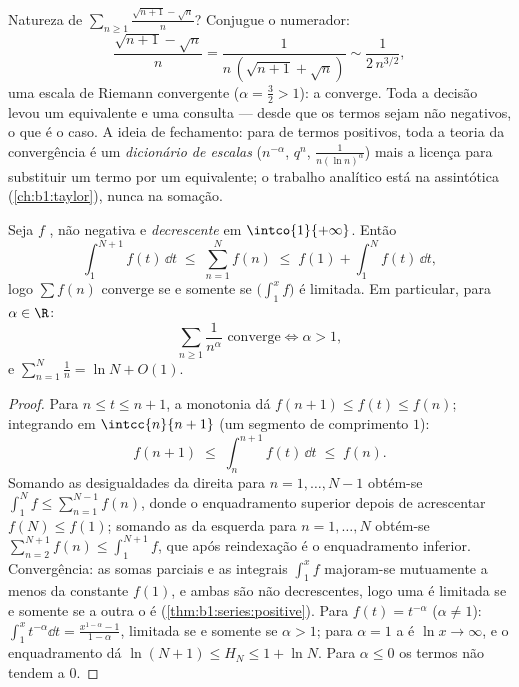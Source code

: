 \begin{example}\label{ex:b1:series:equivtest}
Natureza de $\sum_{n \geq 1} \frac{\sqrt{n+1} - \sqrt n}{n}$?
Conjugue o numerador:
\[
\frac{\sqrt{n+1} - \sqrt n}{n}
= \frac{1}{n\,(\sqrt{n+1} + \sqrt n)}
\sim \frac{1}{2\,n^{3/2}} ,
\]
uma escala de Riemann convergente ($\alpha = \frac32 > 1$): a 
converge. Toda a decisão levou um equivalente e uma consulta
--- desde que os termos sejam não negativos, o que é o caso. A
ideia de fechamento: para  de termos positivos, toda a teoria
da convergência é um \emph{dicionário de escalas} ($n^{-\alpha}$, $q^n$,
$\frac{1}{n(\ln n)^\alpha}$) mais a licença para substituir um termo
por um equivalente; o trabalho analítico está na assintótica
(\cref{ch:b1:taylor}), nunca na somação.
\end{example}

\begin{theorem}\label{thm:b1:series:riemann}
Seja $f$ , não negativa e \emph{decrescente} em
$\intco{1}{+\infty}$. Então
\[
\int_1^{N+1} f(t)\,\dd t \;\leq\; \sum_{n=1}^{N} f(n) \;\leq\; f(1)
+ \int_1^{N} f(t)\,\dd t ,
\]
logo $\sum f(n)$ converge se e somente se $\bigl(\int_1^x f\bigr)$ é limitada. Em
particular, para $\alpha \in \R$:
\[
\sum_{n \geq 1} \frac{1}{n^\alpha} \text{ converge}
\iff \alpha > 1,
\]
e $\sum_{n=1}^{N} \frac1n = \ln N + O(1)$.
\end{theorem}

\begin{proof}
Para $n \leq t \leq n+1$, a monotonia dá $f(n+1) \leq f(t)
\leq f(n)$; integrando em $\intcc{n}{n+1}$ (um segmento de
comprimento $1$):
\[
f(n+1) \;\leq\; \int_n^{n+1} f(t)\,\dd t \;\leq\; f(n) .
\]
Somando as desigualdades da direita para $n = 1, \dots, N-1$ obtém-se
$\int_1^{N} f \leq \sum_{n=1}^{N-1} f(n)$, donde o enquadramento
superior depois de acrescentar $f(N) \leq f(1)$; somando as da esquerda para
$n = 1, \dots, N$ obtém-se $\sum_{n=2}^{N+1} f(n) \leq
\int_1^{N+1} f$, que após reindexação é o enquadramento inferior.
Convergência: as somas parciais e as integrais $\int_1^x f$
majoram-se mutuamente a menos da constante $f(1)$, e ambas são
não decrescentes, logo uma é limitada se e somente se a outra o é
(\cref{thm:b1:series:positive}). Para $f(t)
= t^{-\alpha}$ ($\alpha \neq 1$): $\int_1^x t^{-\alpha}\dd t =
\frac{x^{1-\alpha} - 1}{1 - \alpha}$, limitada se e somente se $\alpha > 1$;
para $\alpha = 1$ a  é $\ln x \to \infty$, e o enquadramento
dá $\ln(N+1) \leq H_N \leq 1 + \ln N$. Para $\alpha \leq 0$ os
termos não tendem a $0$.
\end{proof}

